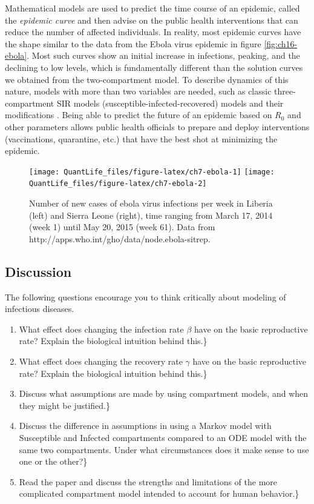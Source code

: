 \documentclass[
]{book}
\theoremstyle{definition}
\theoremstyle{definition}
\theoremstyle{definition}
\theoremstyle{remark}
\begin{document}
Mathematical models are used to predict the time course of an epidemic, called the  \emph{epidemic curve} and then advise on the public health interventions that can reduce the number of affected individuals. In reality, most epidemic curves have the shape similar to the data from the Ebola virus epidemic in figure \ref{fig:ch16-ebola}. Most such curves show an initial increase in infections, peaking, and the declining to low levels, which is fundamentally different than the solution curves we obtained from the two-compartment model. To describe dynamics of this nature, models with more than two variables are needed, such as classic three-compartment SIR models (susceptible-infected-recovered) models and their modifications \citep{brauer_mathematical_2011}. Being able to predict the future of an epidemic based on \(R_0\) and other parameters allows public health officials to prepare and deploy interventions (vaccinations, quarantine, etc.) that have the best shot at minimizing the epidemic.

\begin{figure}

{\centering \texttt{[image: QuantLife\_files/figure-latex/ch7-ebola-1]} \texttt{[image: QuantLife\_files/figure-latex/ch7-ebola-2]} 

}

\caption{Number of new cases of ebola virus infections  per week in Liberia (left) and Sierra Leone (right), time ranging from March 17, 2014 (week 1) until May 20, 2015 (week 61). Data from http://apps.who.int/gho/data/node.ebola-sitrep.}\label{fig:ch7-ebola}
\end{figure}

\hypertarget{discussion}{%
\subsection{Discussion}\label{discussion}}

The following questions encourage you to think critically about modeling of infectious diseases.

\begin{enumerate}
\def\labelenumi{\arabic{enumi}.}
\item
  What effect does changing the infection rate \(\beta\) have on the basic reproductive rate? Explain the biological intuition behind this.\}
\item
  What effect does changing the recovery rate \(\gamma\) have on the basic reproductive rate? Explain the biological intuition behind this.\}
\item
  Discuss what assumptions are made by using compartment models, and when they might be justified.\}
\item
  Discuss the difference in assumptions in using a Markov model with Susceptible and Infected compartments compared to an ODE model with the same two compartments. Under what circumstances does it make sense to use one or the other?\}
\item
  Read the paper \citep{agusto_mathematical_2015} and discuss the strengths and limitations of the more complicated compartment model intended to account for human behavior.\}
\end{enumerate}
\end{document}
